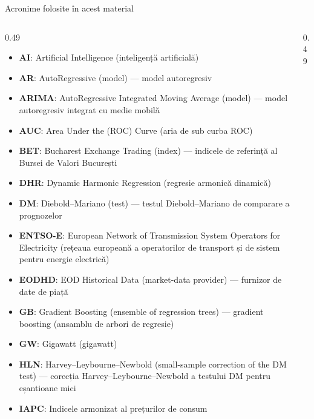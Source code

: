 {
\begin{frame}[noframenumbering]
    \titlepage
\end{frame}
}
\begin{frame}{Acronime folosite în acest material}
\begin{columns}[T]
\begin{column}{0.49\textwidth}
\begin{itemize}\setlength{\itemsep}{0pt}
    \item \textbf{AI}: Artificial Intelligence (inteligență artificială)
    \item \textbf{AR}: AutoRegressive (model) — model autoregresiv
    \item \textbf{ARIMA}: AutoRegressive Integrated Moving Average (model) — model autoregresiv integrat cu medie mobilă
    \item \textbf{AUC}: Area Under the (ROC) Curve (aria de sub curba ROC)
    \item \textbf{BET}: Bucharest Exchange Trading (index) — indicele de referință al Bursei de Valori București
    \item \textbf{DHR}: Dynamic Harmonic Regression (regresie armonică dinamică)
    \item \textbf{DM}: Diebold–Mariano (test) — testul Diebold–Mariano de comparare a prognozelor
    \item \textbf{ENTSO-E}: European Network of Transmission System Operators for Electricity (rețeaua europeană a operatorilor de transport și de sistem pentru energie electrică)
    \item \textbf{EODHD}: EOD Historical Data (market-data provider) — furnizor de date de piață
    \item \textbf{GB}: Gradient Boosting (ensemble of regression trees) — gradient boosting (ansamblu de arbori de regresie)
    \item \textbf{GW}: Gigawatt (gigawatt)
    \item \textbf{HLN}: Harvey–Leybourne–Newbold (small-sample correction of the DM test) — corecția Harvey–Leybourne–Newbold a testului DM pentru eșantioane mici
    \item \textbf{IAPC}: Indicele armonizat al prețurilor de consum
\end{itemize}
\end{column}
\begin{column}{0.49\textwidth}

\end{column}
\end{columns}
\end{frame}
